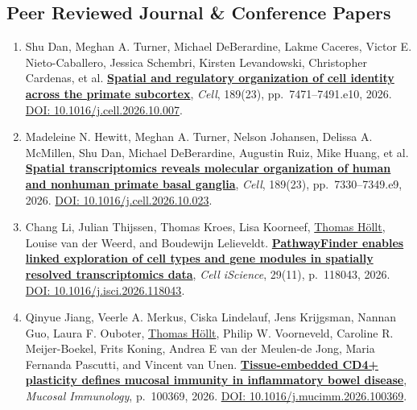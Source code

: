\documentclass[10pt,a4paper,roman,final]{moderncv}
\newcommand*\highlightauthor[1]{\underline{#1}}
\begin{document}
\subsection*{Peer Reviewed Journal \& Conference Papers}
\begin{enumerate}[leftmargin=0cm,start=2]
\item
Shu Dan, Meghan A. Turner, Michael DeBerardine, Lakme Caceres, Victor E. Nieto-Caballero, Jessica Schembri, Kirsten Levandowski, Christopher Cardenas, et al.
\href{https://www.thomashollt.com/publications/2026_primatesubcortex/}{\textbf{Spatial and regulatory organization of cell identity across the primate subcortex}},
\emph{Cell}, 189(23), pp.~7471--7491.e10,
2026.
\href{https://doi.org/10.1016/j.cell.2026.10.007}{DOI: 10.1016/\allowbreak j.cell.2026.10.007}.


\item
Madeleine N. Hewitt, Meghan A. Turner, Nelson Johansen, Delissa A. McMillen, Shu Dan, Michael DeBerardine, Augustin Ruiz, Mike Huang, et al.
\href{https://www.thomashollt.com/publications/2026_basalganglia/}{\textbf{Spatial transcriptomics reveals molecular organization of human and nonhuman primate basal ganglia}},
\emph{Cell}, 189(23), pp.~7330--7349.e9,
2026.
\href{https://doi.org/10.1016/j.cell.2026.10.023}{DOI: 10.1016/\allowbreak j.cell.2026.10.023}.


\item
Chang Li, Julian Thijssen, Thomas Kroes, Lisa Koorneef, \highlightauthor{Thomas Höllt}, Louise van der Weerd, and Boudewijn Lelieveldt.
\href{https://www.thomashollt.com/publications/2026_pathwayfinder/}{\textbf{PathwayFinder enables linked exploration of cell types and gene modules in spatially resolved transcriptomics data}},
\emph{Cell iScience}, 29(11), p.~118043,
2026.
\href{https://doi.org/10.1016/j.isci.2026.118043}{DOI: 10.1016/\allowbreak j.isci.2026.118043}.


\item
Qinyue Jiang, Veerle A. Merkus, Ciska Lindelauf, Jens Krijgsman, Nannan Guo, Laura F. Ouboter, \highlightauthor{Thomas Höllt}, Philip W. Voorneveld, Caroline R. Meijer-Boekel, Frits Koning, Andrea E van der Meulen-de Jong, Maria Fernanda Pascutti, and Vincent van Unen.
\href{https://www.thomashollt.com/publications/2026_mucosalimmunology/}{\textbf{Tissue-embedded CD4+ plasticity defines mucosal immunity in inflammatory bowel disease}},
\emph{Mucosal Immunology}, p.~100369,
2026.
\href{https://doi.org/10.1016/j.mucimm.2026.100369}{DOI: 10.1016/\allowbreak j.mucimm.2026.100369}.



\end{enumerate}
\end{document}

